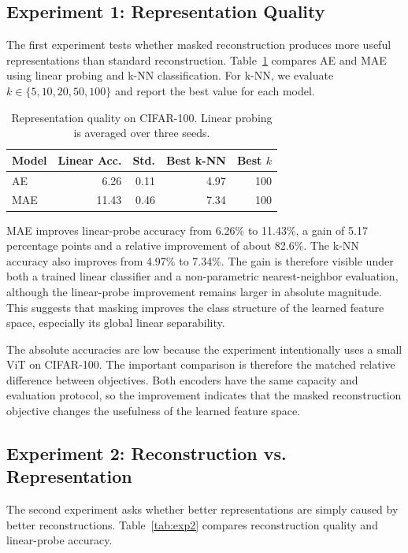 \documentclass[10pt,twocolumn,letterpaper]{article}
\begin{document}
\subsection{Experiment 1: Representation Quality}

The first experiment tests whether masked reconstruction produces more useful representations than standard reconstruction. Table~\ref{tab:exp1} compares AE and MAE using linear probing and k-NN classification. For k-NN, we evaluate $k \in \{5, 10, 20, 50, 100\}$ and report the best value for each model.

\begin{table}[t]
\centering
\caption{Representation quality on CIFAR-100. Linear probing is averaged over three seeds.}
\label{tab:exp1}
\begin{tabular}{lrrrr}
\toprule
Model & Linear Acc. & Std. & Best k-NN & Best $k$ \\
\midrule
AE  & 6.26 & 0.11 & 4.97 & 100 \\
MAE & 11.43 & 0.46 & 7.34 & 100 \\
\bottomrule
\end{tabular}
\end{table}

MAE improves linear-probe accuracy from 6.26\% to 11.43\%, a gain of 5.17 percentage points and a relative improvement of about 82.6\%. The k-NN accuracy also improves from 4.97\% to 7.34\%. The gain is therefore visible under both a trained linear classifier and a non-parametric nearest-neighbor evaluation, although the linear-probe improvement remains larger in absolute magnitude. This suggests that masking improves the class structure of the learned feature space, especially its global linear separability.

The absolute accuracies are low because the experiment intentionally uses a small ViT on CIFAR-100. The important comparison is therefore the matched relative difference between objectives. Both encoders have the same capacity and evaluation protocol, so the improvement indicates that the masked reconstruction objective changes the usefulness of the learned feature space.

\subsection{Experiment 2: Reconstruction vs. Representation}

The second experiment asks whether better representations are simply caused by better reconstructions. Table~\ref{tab:exp2} compares reconstruction quality and linear-probe accuracy.
\end{document}
